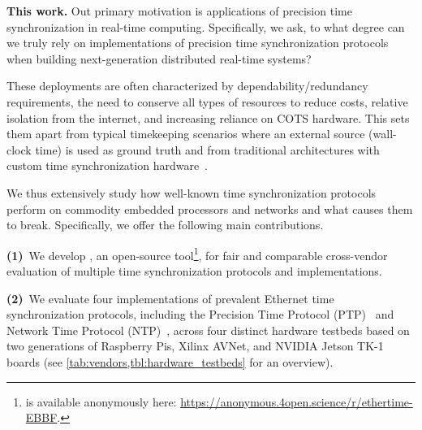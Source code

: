 \textbf{This work.}
Out primary motivation is applications of precision time synchronization in real-time computing.
Specifically, we ask, to what degree can we truly rely on implementations of precision time synchronization protocols
when building next-generation distributed real-time systems? %

These deployments %
are often %
characterized by dependability/redundancy requirements,
the need to conserve all types of resources to reduce costs,
relative isolation from the internet, %
and increasing reliance on COTS hardware.
This sets them apart from typical timekeeping scenarios where an external source
(wall-clock time) is used as ground truth
and from traditional architectures with custom time synchronization hardware~\cite{wensley1978sift,hopkins1978ftmp}.

We thus extensively study how well-known time synchronization protocols perform
on commodity embedded processors and networks and what causes them to break.
Specifically, we offer the following main contributions.

\textbf{(1)}~We develop \toolName{}, an open-source tool\footnote{\toolName{} is available anonymously here: \url{https://anonymous.4open.science/r/ethertime-EBBF}.}, for fair and comparable cross-vendor evaluation of multiple time synchronization protocols and implementations.

\textbf{(2)}~We evaluate %
four implementations of prevalent Ethernet time synchronization protocols, %
including the Precision Time Protocol (PTP)~\cite{ptp-spec} and Network Time Protocol (NTP)~\cite{ntpv4-spec},
across four distinct hardware testbeds
based on two generations of Raspberry Pis,
Xilinx AVNet, and NVIDIA Jetson TK-1 boards (see \cref{tab:vendors,tbl:hardware_testbeds} for an overview).

